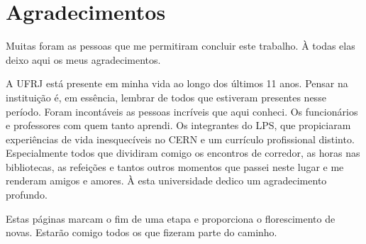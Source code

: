 \chapter*{Agradecimentos}

Muitas foram as pessoas que me permitiram concluir este trabalho.
À todas elas deixo aqui os meus agradecimentos.

A UFRJ está presente em minha vida ao longo dos últimos 11 anos.
Pensar na instituição é, em essência, lembrar de todos que estiveram presentes nesse período.
Foram incontáveis as pessoas incríveis que aqui conheci.
Os funcionários e professores com quem tanto aprendi.
Os integrantes do LPS, que propiciaram experiências de vida inesquecíveis no CERN e um currículo profissional distinto.
Especialmente todos que dividiram comigo os encontros de corredor, as horas nas bibliotecas, as refeições e tantos outros momentos que passei neste lugar e me renderam amigos e amores.
À esta universidade dedico um agradecimento profundo.

Estas páginas marcam o fim de uma etapa e proporciona o florescimento de novas.
Estarão comigo todos os que fizeram parte do caminho.

